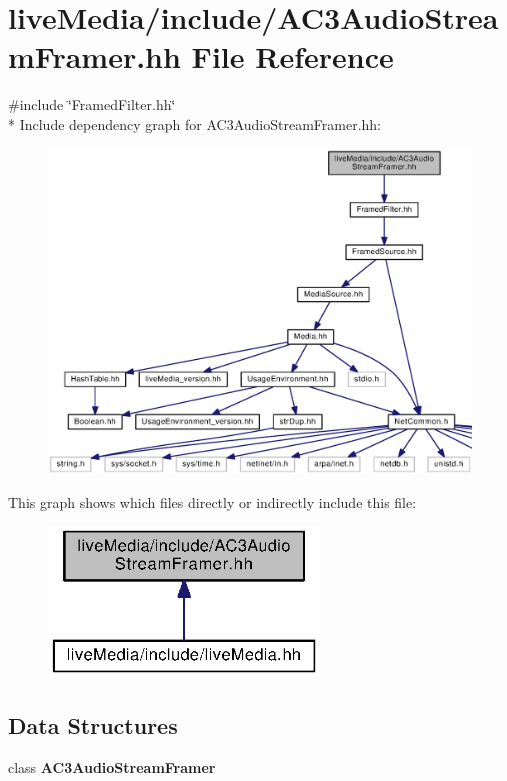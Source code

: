\section{live\+Media/include/\+A\+C3\+Audio\+Stream\+Framer.hh File Reference}
\label{AC3AudioStreamFramer_8hh}
{\ttfamily \#include \char`\"{}Framed\+Filter.\+hh\char`\"{}}\\*
Include dependency graph for A\+C3\+Audio\+Stream\+Framer.\+hh\+:
\nopagebreak
\begin{figure}[H]
\begin{center}
\leavevmode
\includegraphics[width=350pt]{AC3AudioStreamFramer_8hh__incl}
\end{center}
\end{figure}
This graph shows which files directly or indirectly include this file\+:
\nopagebreak
\begin{figure}[H]
\begin{center}
\leavevmode
\includegraphics[width=204pt]{AC3AudioStreamFramer_8hh__dep__incl}
\end{center}
\end{figure}
\subsection*{Data Structures}
\begin{DoxyCompactItemize}
\item 
class {\bf A\+C3\+Audio\+Stream\+Framer}
\end{DoxyCompactItemize}
